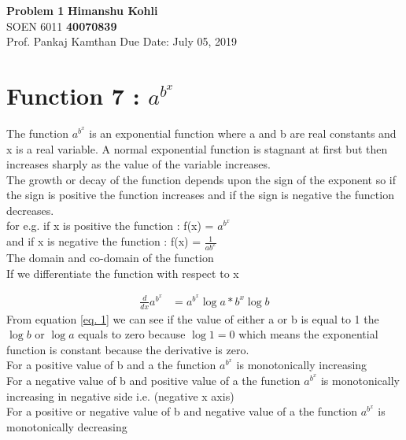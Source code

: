 \documentclass[a4paper, 11pt]{article}
\begin{document}
\noindent
\large\textbf{Problem 1} \hfill \textbf{Himanshu Kohli} \\
\normalsize SOEN 6011 \hfill \textbf{40070839} \\
Prof. Pankaj Kamthan \hfill Due Date: July 05, 2019 \\


\section{Function 7 :  $a^{b^{x}}$}

The function $a^{b^{x}}$ is an exponential function where a and b are real constants and x is a real variable. A normal exponential function is stagnant at first but then increases sharply as the value of the variable increases. \\

The growth or decay of the function depends upon the sign of the exponent so if the sign is positive the function increases and if the sign is negative the function decreases.\\

for e.g. if x is positive the function : f(x) = $a^{b^{x}}$ \\

and if x is negative the function : f(x) = $\frac{1}{a{b^{x}}}$ \\

The domain and co-domain of the function \\

If we differentiate the function with respect to x

\begin{equation} \label{eq. 1}
    \begin{split}
        \frac{d}{dx}  a^{b^{x}} & = a^{b^{x}} \log{a} * b^x \log{b}
    \end{split}
\end{equation} 
\newline
From equation \ref{eq. 1} we can see if the value of either a or b is equal to 1 the $\log{b}$ or $\log{a}$ equals to zero because $\log{1} = 0$ which means the exponential function is constant because the derivative is zero. \\
For a positive value of b and a the function $a^{b^{x}}$ is monotonically increasing \\
For a negative value of b and positive value of a the function $a^{b^{x}}$ is monotonically increasing in negative side i.e. (negative x axis)  \\
For a positive or negative value of b and negative value of a the function $a^{b^{x}}$ is monotonically decreasing  \\
\end{document}
